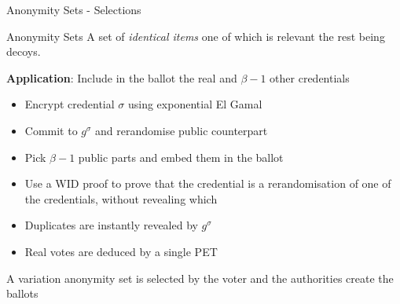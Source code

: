 \documentclass{beamer}
\begin{document}
\begin{frame}[allowframebreaks]{Anonymity Sets - Selections \cite{CH11}}
\begin{block}{Anonymity Sets}
A set of \textit{identical items} one of which is relevant the rest being decoys. 
\end{block}

\textbf{Application}: Include in the ballot the real and $\beta-1$ other credentials

\begin{itemize}
\item Encrypt credential $\sigma$ using exponential El Gamal
\item Commit to $g^\sigma$ and rerandomise public counterpart
\item Pick $\beta-1$ public parts and embed them in the ballot
\item Use a WID proof to prove that the credential is a rerandomisation of one of the credentials, without revealing which
\item Duplicates are instantly revealed by $g^\sigma$
\item Real votes are deduced by a single PET
\end{itemize}

A variation \cite{SpycherKHS11} anonymity set is selected by the voter and the authorities create the ballots

\end{frame}
\end{document}
